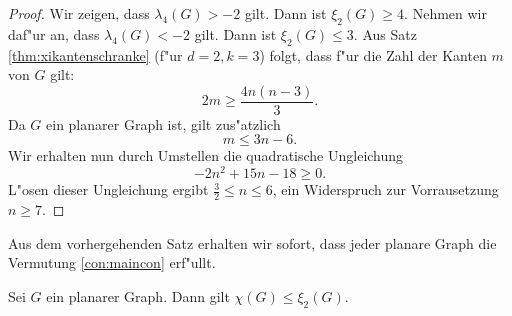   \begin{proof}
    Wir zeigen, dass $\lambda_4(G) > -2$ gilt. Dann ist $\xi_{2}(G) \geq 4$. 
    Nehmen wir daf"ur an, dass $\lambda_{4}(G) < -2$ gilt.
    Dann ist $\xi_{2}(G)\leq 3$. Aus Satz \ref{thm:xikantenschranke} (f"ur $d=2, k=3$) folgt, dass f"ur die Zahl der Kanten $m$ von $G$ gilt:
    $$2m \geq \frac{4n(n-3)}{3}.$$
    Da $G$ ein planarer Graph ist, gilt zus"atzlich $$ m \leq 3n-6.$$
    Wir erhalten nun durch Umstellen die quadratische Ungleichung $$-2n^{2} +15n -18 \geq 0.$$
    L"osen dieser Ungleichung ergibt $ \frac{3}{2} \leq n \leq 6$, ein Widerspruch zur Vorrausetzung $n\geq 7$.
  \end{proof} 
  Aus dem vorhergehenden Satz erhalten wir sofort, dass jeder planare Graph die Vermutung \ref{con:maincon} erf"ullt.
  \begin{corollary}
    Sei $G$ ein planarer Graph. Dann gilt $\chi(G) \leq \xi_{2}(G) $. 
  \end{corollary}
